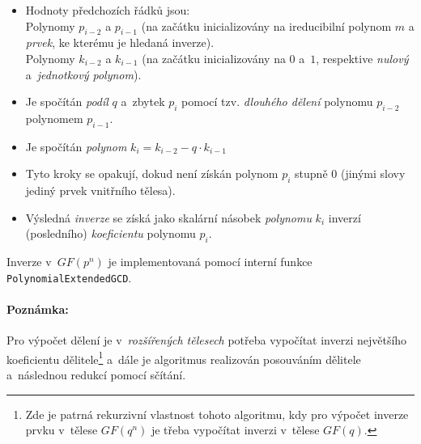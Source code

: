 \documentclass[thesis=M,czech,hidelinks]{FITthesis}[2012/06/26]
\newcommand{\0}{{\textcolor[gray]{0.75}{0}}}
\begin{document}
\begin{itemize}
    \item Hodnoty předchozích řádků jsou:\\
        \hspace*{0.6cm}Polynomy $p_{i-2}$ a $p_{i-1}$ (na začátku inicializovány
            na ireducibilní polynom $m$ a \emph{prvek}, ke kterému je hledaná
            inverze). \\
        \hspace*{0.6cm}Polynomy $k_{i-2}$ a $k_{i-1}$ (na začátku inicializovány
            na $0$ a~$1$, respektive \emph{nulový} a~\emph{jednotkový
            polynom}).

    \item Je spočítán \emph{podíl} $q$ a~zbytek $p_i$ pomocí tzv. \emph{dlouhého
        dělení} polynomu $p_{i-2}$ polynomem $p_{i-1}$.

    \item Je spočítán \emph{polynom} $k_i = k_{i-2} - q \cdot k_{i-1} $

    \item Tyto kroky se opakují, dokud není získán polynom $p_i$ stupně $0$
        (jinými slovy jediný prvek vnitřního tělesa).

    \item Výsledná \emph{inverze} se získá jako skalární násobek \emph{polynomu}
        $k_i$ inverzí (posledního) \emph{koeficientu} polynomu $p_i$.
\end{itemize}

Inverze v~$GF(p^n)$ je implementovaná pomocí interní funkce
\texttt{Polynomial\-ExtendedGCD}.

\paragraph{Poznámka:} Pro výpočet dělení je v~\emph{rozšířených tělesech}
potřeba vypočítat inverzi největšího koeficientu dělitele\footnote{
    Zde je patrná rekurzivní vlastnost tohoto algoritmu, kdy pro výpočet inverze
    prvku v~tělese $GF(q^n)$ je třeba vypočítat inverzi v~tělese $GF(q)$.
} a~dále je algoritmus realizován posouváním dělitele a~následnou redukcí pomocí
sčítání.
\end{document}
